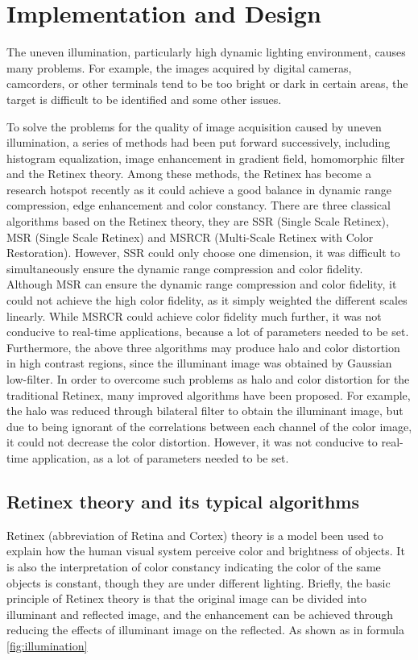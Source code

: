 \chapter{Implementation and Design}
The uneven illumination, particularly high dynamic lighting environment, causes many problems.
For example, the images acquired by digital cameras, camcorders, or other terminals tend to be too
bright or dark in certain areas, the target is difficult to be identified and some other issues. 

To solve the problems for the quality of image acquisition caused by uneven illumination, a
series of methods had been put forward successively, including histogram equalization, image
enhancement in gradient field, homomorphic filter and the Retinex theory. Among these methods,
the Retinex has become a research hotspot recently as it could achieve a good balance in dynamic
range compression, edge enhancement and color constancy. There are three classical algorithms
based on the Retinex theory\cite{retinex}, they are SSR (Single Scale Retinex), MSR (Single Scale Retinex) and MSRCR (Multi-Scale Retinex with Color Restoration)\cite{retinex}. However, SSR could only choose one dimension, it was difficult to simultaneously ensure the dynamic range compression and color
fidelity\cite{retinex}. Although MSR can ensure the dynamic range compression and color fidelity, it could not achieve the high color fidelity, as it simply weighted the different scales linearly. While MSRCR could achieve color fidelity much further, it was not conducive to real-time applications,
because a lot of parameters needed to be set. Furthermore, the above three algorithms may
produce halo and color distortion in high contrast regions, since the illuminant image was
obtained by Gaussian low-filter. 
In order to overcome such problems as halo and color distortion for the traditional Retinex, many
improved algorithms have been proposed. For example, the halo was reduced through bilateral filter
to obtain the illuminant image, but due to being ignorant of the correlations between each channel
of the color image, it could not decrease the color distortion. However, it was not conducive to real-time application, as a lot of parameters needed to be set\cite{msr1}.

\section{Retinex theory and its typical algorithms }
Retinex (abbreviation of Retina and Cortex) theory is a model been used to explain how the
human visual system perceive color and brightness of objects. It is also the interpretation of
color constancy indicating the color of the same objects is constant, though they are under different
lighting. Briefly, the basic principle of Retinex theory \cite{retinex} is that the original image can be divided into illuminant and reflected image, and the enhancement can be achieved through reducing the effects of illuminant image on the reflected. As shown as in formula \eqref{fig:illumination} 

